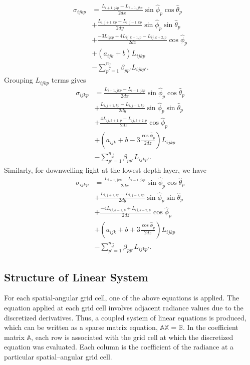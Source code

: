 \begin{equation*}
  \begin{aligned}
    \sigma_{ijkp} &= \frac{L_{i+1,jkp}-L_{i-1,jkp}}{2dx}\sin\hat{\phi}_p\cos\hat{\theta}_p \\
    &+ \frac{L_{i,j+1,kp}-L_{i,j-1,kp}}{2dy}\sin\hat{\phi}_p\sin\hat{\theta}_p \\
    &+ \frac{-3L_{ijkp} + 4L_{ij,k+1,p} - L_{ij,k+2,p}}{2dz}\cos\hat{\phi}_p \\
    &+ (a_{ijk}+b)L_{ijkp} \\
    &- \sum_{p'=1}^{n_{\vec{\omega}}} \beta_{pp'} L_{ijkp'}.
  \end{aligned}
\end{equation*}
Grouping $L_{ijkp}$ terms gives
\begin{equation*}
  \begin{aligned}
    \sigma_{ijkp} &= \frac{L_{i+1,jkp}-L_{i-1,jkp}}{2dx}\sin\hat{\phi}_p\cos\hat{\theta}_p \\
    &+ \frac{L_{i,j+1,kp}-L_{i,j-1,kp}}{2dy}\sin\hat{\phi}_p\sin\hat{\theta}_p \\
    &+ \frac{4L_{ij,k+1,p} - L_{ij,k+2,p}}{2dz}\cos\hat{\phi}_p \\
    &+ \left(a_{ijk}+b - 3\frac{\cos\hat\phi_p}{2dz} \right)L_{ijkp} \\
    &- \sum_{p'=1}^{n_{\vec{\omega}}} \beta_{pp'} L_{ijkp'}.
  \end{aligned}
\end{equation*}
Similarly, for downwelling light at the lowest depth layer, we have
\begin{equation*}
  \begin{aligned}
    \sigma_{ijkp} &= \frac{L_{i+1,jkp}-L_{i-1,jkp}}{2dx}\sin\hat{\phi}_p\cos\hat{\theta}_p \\
    &+ \frac{L_{i,j+1,kp}-L_{i,j-1,kp}}{2dy}\sin\hat{\phi}_p\sin\hat{\theta}_p \\
    &+ \frac{-4L_{ij,k-1,p} + L_{ij,k-2,p}}{2dz}\cos\hat{\phi}_p \\
    &+ \left(a_{ijk}+b + 3\frac{\cos\hat\phi_p}{2dz} \right)L_{ijkp} \\
    &- \sum_{p'=1}^{n_{\vec{\omega}}} \beta_{pp'} L_{ijkp'}.
  \end{aligned}
\end{equation*}

\subsection{Structure of Linear System}
For each spatial-angular grid cell, one of the above equations is applied.
The equation applied at each grid cell involves adjacent radiance values due to the discretized derivatives.
Thus, a coupled system of linear equations is produced, which can be written as a sparse matrix equation, $\mathbb{AX=B}$.
In the coefficient matrix $\mathbb{A}$, each row is associated with the grid cell at which the discretized equation was evaluated.
Each column is the coefficient of the radiance at a particular spatial--angular grid cell.

